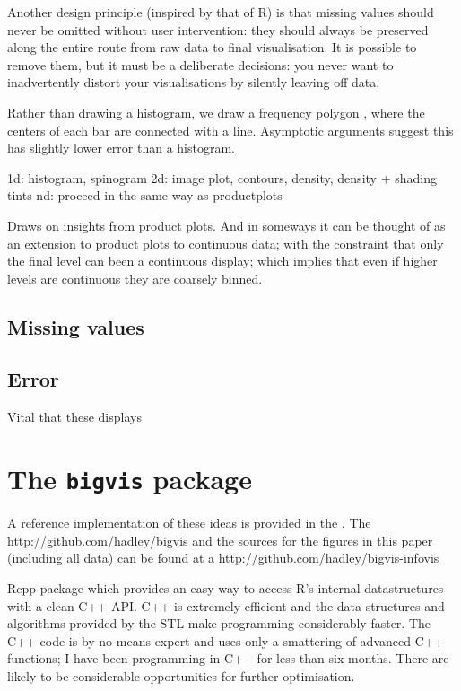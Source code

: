 \documentclass[journal]{vgtc}                %
\begin{document}
Another design principle (inspired by that of R) is that missing values should never be omitted without user intervention: they should always be preserved along the entire route from raw data to final visualisation. It is possible to remove them, but it must be a deliberate decisions: you never want to inadvertently distort your visualisations by silently leaving off data.

Rather than drawing a histogram, we draw a frequency polygon \citep{scott:1985a}, where the centers of each bar are connected with a line.  Asymptotic arguments suggest this has slightly lower error than a histogram.

1d: histogram, spinogram
2d: image plot, contours, density, density + shading tints
nd: proceed in the same way as productplots

Draws on insights from product plots. And in someways it can be thought of as an extension to product plots to continuous data; with the constraint that only the final level can been a continuous display; which implies that even if higher levels are continuous they are coarsely binned.

\subsection{Missing values}

\subsection{Error}

Vital that these displays

\section{The {\tt bigvis} package}
\label{sec:bigvis}

A reference implementation of these ideas is provided in the .  The \url{http://github.com/hadley/bigvis} and the sources for the figures in this paper (including all data) can be found at a \url{http://github.com/hadley/bigvis-infovis}

Rcpp package which provides an easy way to access R's internal datastructures with a clean C++ API.  C++ is extremely efficient and the data structures and algorithms provided by the STL make programming considerably faster.  The C++ code is by no means expert and uses only a smattering of advanced C++ functions; I have been programming in C++ for less than six months. There are likely to be considerable opportunities for further optimisation.
\end{document}
